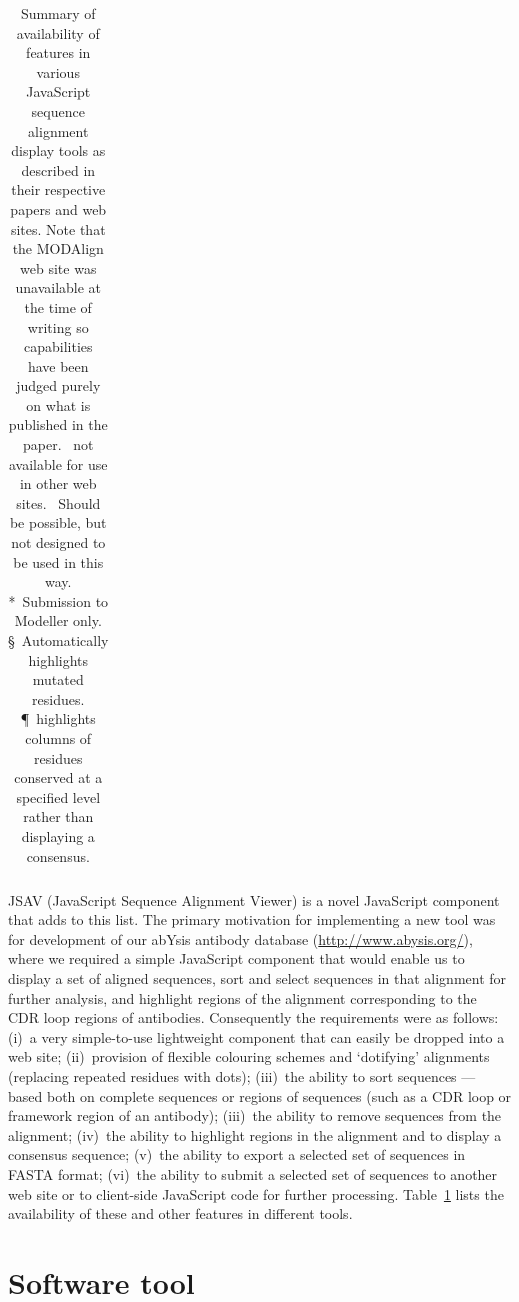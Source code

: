 \documentclass[10pt,a4paper,twocolumn]{article}
\begin{document}
\begin{table}
\begin{center}
\begin{tabularx}{\linewidth}{Xlllll}
\end{tabularx}
\end{center}
\caption{\label{tab:features}Summary of availability of features in
  various JavaScript sequence alignment display tools as described in
  their respective papers and web sites. Note that the MODAlign web
  site was unavailable at the time of writing so capabilities have
  been judged purely on what is published in the paper. \dag~not
  available for use in other web sites. \ddag~Should be possible,
  but not designed to be used in this way. *~Submission to Modeller
  only. \S~Automatically highlights mutated residues. \P~highlights
  columns of residues conserved at a specified level rather than
  displaying a consensus.} 
\end{table}

JSAV (JavaScript Sequence Alignment Viewer) is a novel JavaScript
component that adds to this list. The primary motivation for
implementing a new tool was for development of our abYsis antibody
database (\url{http://www.abysis.org/}), where we required a simple
JavaScript component that would enable us to display a set of aligned
sequences, sort and select sequences in that alignment for further
analysis, and highlight regions of the alignment corresponding to the
CDR loop regions of antibodies. Consequently the requirements were as
follows: (i)~a very simple-to-use lightweight component that can
easily be dropped into a web site; (ii)~provision of flexible
colouring schemes and `dotifying' alignments (replacing repeated
residues with dots); (iii)~the ability to sort sequences --- based
both on complete sequences or regions of sequences (such as a CDR loop
or framework region of an antibody); (iii)~the ability to remove
sequences from the alignment; (iv)~the ability to highlight regions in
the alignment and to display a consensus sequence; (v)~the ability to
export a selected set of sequences in FASTA format; (vi)~the ability
to submit a selected set of sequences to another web site or to
client-side JavaScript code for further processing.
Table~\ref{tab:features} lists the availability of these and other
features in different tools.

\section*{Software tool}
\end{document}
